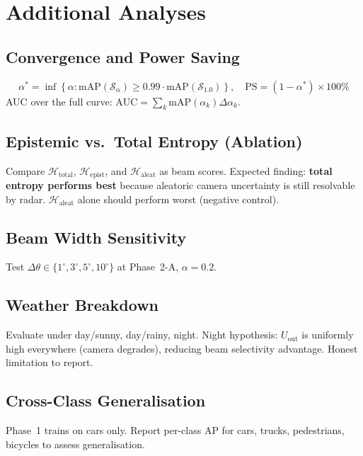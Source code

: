 \documentclass[12pt, a4paper]{article}
\newcommand{\Hent}{\mathcal{H}}
\newcommand{\beamset}{\mathcal{S}}
\newcommand{\Uout}{U_{\mathrm{out}}}
\theoremstyle{definition}
\begin{document}
\section{Additional Analyses}
\label{sec:additional}

\subsection{Convergence and Power Saving}
\begin{equation}
  \alpha^* = \inf\left\{\alpha:\mathrm{mAP}(\beamset_\alpha)
    \geq 0.99\cdot\mathrm{mAP}(\beamset_{1.0})\right\},
  \quad
  \mathrm{PS} = (1-\alpha^*)\times100\%
  \label{eq:convergence}
\end{equation}
AUC over the full curve: $\mathrm{AUC}=\sum_k\mathrm{mAP}(\alpha_k)\Delta\alpha_k$.

\subsection{Epistemic vs.\ Total Entropy (Ablation)}

\begin{ablationbox}
Compare $\Hent_\mathrm{total}$, $\Hent_\mathrm{epist}$, and $\Hent_\mathrm{aleat}$
as beam scores. Expected finding: \textbf{total entropy performs best} because
aleatoric camera uncertainty is still resolvable by radar.
$\Hent_\mathrm{aleat}$ alone should perform worst (negative control).
\end{ablationbox}

\subsection{Beam Width Sensitivity}
Test $\Delta\theta\in\{1^\circ,3^\circ,5^\circ,10^\circ\}$ at Phase~2-A,
$\alpha=0.2$.

\subsection{Weather Breakdown}
Evaluate under day/sunny, day/rainy, night.
Night hypothesis: $\Uout$ is uniformly high everywhere (camera degrades),
reducing beam selectivity advantage. Honest limitation to report.

\subsection{Cross-Class Generalisation}
Phase~1 trains on cars only. Report per-class AP for cars, trucks, pedestrians,
bicycles to assess generalisation.
\end{document}
